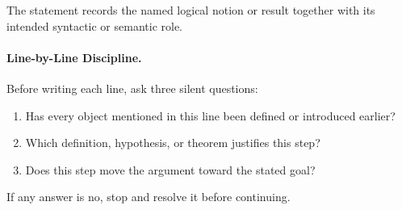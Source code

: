 \begin{remark*}[Interpretation]
The statement records the named logical notion or result together with its
intended syntactic or semantic role.
\end{remark*}


\paragraph{Line-by-Line Discipline.}

Before writing each line, ask three silent questions:
\begin{enumerate}[label=(\roman*), itemsep=2pt]
  \item Has every object mentioned in this line been defined or introduced earlier?
  \item Which definition, hypothesis, or theorem justifies this step?
  \item Does this step move the argument toward the stated goal?
\end{enumerate}
If any answer is no, stop and resolve it before continuing.
